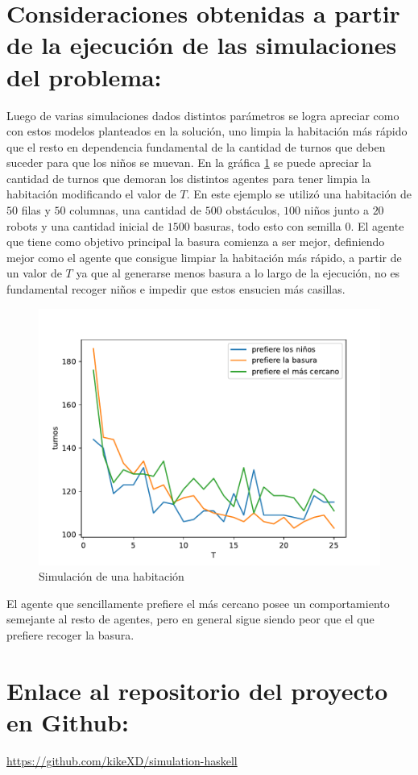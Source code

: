 \documentclass[titlepage,11pt]{scrartcl}
\begin{document}
\section{Consideraciones obtenidas a partir de la ejecución de las simulaciones del problema:}
Luego de varias simulaciones dados distintos parámetros se logra apreciar como con estos modelos planteados en la solución, uno limpia la habitación más rápido que el resto en dependencia fundamental de la cantidad de turnos que deben suceder para que los niños se muevan. En la gráfica \ref{fig:simulation} se puede apreciar la cantidad de turnos que demoran los distintos agentes para tener limpia la habitación modificando el valor de $T$. En este ejemplo se utilizó una habitación de $50$ filas y $50$ columnas, una cantidad de $500$ obstáculos, $100$ niños junto a $20$ robots y una cantidad inicial de $1500$ basuras, todo esto con semilla $0$. El agente que tiene como objetivo principal la basura comienza a ser mejor, definiendo mejor como el agente que consigue limpiar la habitación más rápido, a partir de un valor de $T$ ya que al generarse menos basura a lo largo de la ejecución, no es fundamental recoger niños e impedir que estos ensucien más casillas.

\begin{figure}[htb]
    \begin{center}
        \includegraphics[width=\columnwidth]{./media/simulation.pdf}
    \end{center}
    \caption{Simulación de una habitación\label{fig:simulation}}
\end{figure}

El agente que sencillamente prefiere el más cercano posee un comportamiento semejante al resto de agentes, pero en general sigue siendo peor que el que prefiere recoger la basura.

\section{Enlace al repositorio del proyecto en Github:}
\url{https://github.com/kikeXD/simulation-haskell}
\end{document}
